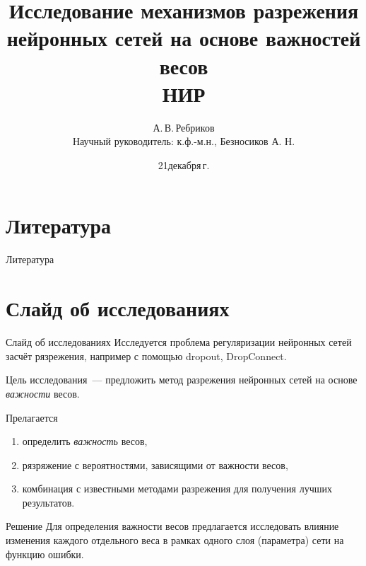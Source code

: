 \documentclass[10pt,pdf,hyperref={unicode}]{beamer}
\title[Исследование механизмов разрежения нейронных сетей на основе важностей весов]{Исследование механизмов разрежения нейронных сетей на основе важностей весов \\ НИР}
\author{А.\,В.\,Ребриков \\ Научный руководитель:	к.ф.-м.н., Безносиков А. Н.}
\institute[]{Московский физико-технический институт}
\date[2024]{\small 21\;декабря\;2024\,г.}
\begin{document}
\begin{frame}
\titlepage
\end{frame}



\section{Литература}
\begin{frame}{Литература}


\nocite{*}
\end{frame}


\section{Слайд об исследованиях}
\begin{frame}{Слайд об исследованиях}
\bigskip
Исследуется проблема регуляризации нейронных сетей засчёт рязрежения, например с помощью dropout, DropConnect.
\begin{block}{Цель исследования~---}
предложить метод разрежения нейронных сетей на основе \emph{важности} весов.
\end{block}
\begin{block}{Прелагается}
\justifying
\begin{enumerate}[1)]
\item определить \emph{важность} весов,
\item рязряжение с вероятностями, зависящими от важности весов,
\item комбинация с известными методами разрежения для получения лучших результатов.
\end{enumerate}
\end{block}
\begin{block}{Решение}
Для определения важности весов предлагается исследовать влияние изменения каждого отдельного веса в рамках одного слоя (параметра) сети на функцию ошибки.
\end{block}
\end{frame}

\end{document}
